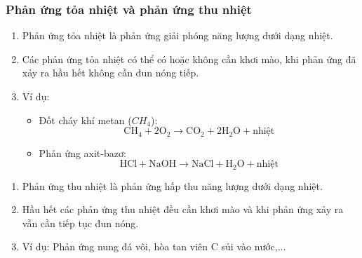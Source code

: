 \documentclass[Main.tex]{subfiles}
\begin{document}
	\subsubsection{Phản ứng tỏa nhiệt và phản ứng thu nhiệt}
	\begin{ghinho}
		\begin{enumerate}
			\item Phản ứng tỏa nhiệt là phản ứng giải phóng năng lượng dưới dạng nhiệt.
			\item Các phản ứng tỏa nhiệt có thể có hoặc không cần khơi mào, khi phản ứng đã xảy ra hầu hết không cần đun nóng tiếp.
			\item Ví dụ:
			\begin{itemize}
				\item  Đốt cháy khí metan ($CH_4$):
			$$
			\text{CH}_4 + 2\text{O}_2 \rightarrow \text{CO}_2 + 2\text{H}_2\text{O} + \text{nhiệt}
			$$
				\item  Phản ứng axit-bazơ:
			$$
			\text{HCl} + \text{NaOH} \rightarrow \text{NaCl} + \text{H}_2\text{O} + \text{nhiệt}
			$$
			\end{itemize}
		\end{enumerate}
	\end{ghinho}
	\begin{ghinho}
		\begin{enumerate}
			\item Phản ứng thu nhiệt là phản ứng hấp thu năng lượng dưới dạng nhiệt.
			\item Hầu hết các phản ứng thu nhiệt đều cần khơi mào và khi phản ứng xảy ra vẫn cần tiếp tục đun nóng.
			\item Ví dụ: Phản ứng nung đá vôi, hòa tan viên C sủi vào nước,$\ldots$ 
		\end{enumerate}
	\end{ghinho}
\end{document}
